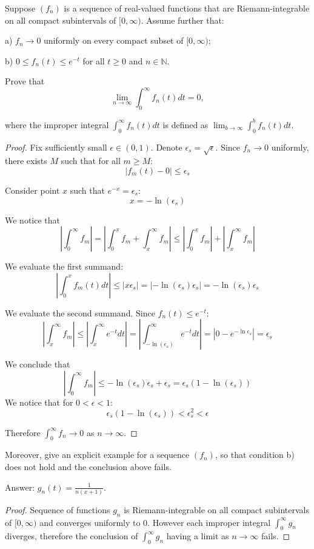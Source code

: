 \documentclass{article}
\begin{document}
\begin{tcolorbox}
Suppose $(f_n)$ is a sequence of real-valued functions that are Riemann-integrable on all compact subintervals of $[0,\infty)$. Assume further that:

a) $f_n \to 0$ uniformly on every compact subset of $[0,\infty)$;

b) $0 \leq f_n(t) \leq e^{-t}$ for all $t \geq 0$ and $n \in \mathbb{N}$.

Prove that
$$ \lim_{n \to \infty} \int_0^\infty f_n(t) dt = 0,$$

where the improper integral $\int_0^\infty f_n(t) dt$ is defined as  $\lim_{b\to\infty} \int_0^b f_n(t) dt$.
\end{tcolorbox}
\begin{proof}
Fix sufficiently small $\epsilon \in (0,1)$. Denote $\epsilon_s = \sqrt{\epsilon}$. Since $f_n \to 0$ uniformly, there exists $M$ such that for all $m \geq M$:
$$ | f_m(t) - 0 | \leq \epsilon_s $$

Consider point $x$ such that $e^{-x} = \epsilon_s$:
$$ x = - \ln(\epsilon_s) $$

We notice that
$$ \left| \int_0^\infty f_m \right| 
= \left| \int_0^x f_m + \int_x^\infty f_m \right|
\leq \left| \int_0^x f_m \right| + \left| \int_x^\infty f_m \right| $$

We evaluate the first summand:
$$ \left| \int_0^x f_m(t) dt \right| \leq | x \epsilon_s | 
= | - \ln(\epsilon_s) \epsilon_s | 
=  - \ln(\epsilon_s) \epsilon_s $$

We evaluate the second summand. Since $f_n(t) \leq e^{-t}$:
$$ \left| \int_x^\infty f_m \right| 
\leq \left | \int_x^\infty e^{-t} dt \right|
= \left| \int_{- \ln(\epsilon_s)}^\infty e^{-t} dt \right|
= \left| 0 - e^{ - \ln \epsilon_s} \right| = \epsilon_s $$

We conclude that 
$$ \left| \int_0^\infty f_m \right| 
\leq - \ln(\epsilon_s) \epsilon_s + \epsilon_s
= \epsilon_s (1-\ln(\epsilon_s)) $$
We notice that for $0 < \epsilon < 1$:
$$ \epsilon_s (1-\ln(\epsilon_s)) < \epsilon_s^2 < \epsilon $$

Therefore $\int_0^\infty f_n \to 0$ as $n \to \infty$.
\end{proof}

\begin{tcolorbox}
Moreover, give an explicit example for a sequence $(f_n)$, so that condition b) does not hold and the conclusion above fails.
\end{tcolorbox}
Answer: $g_n(t) = \frac{1}{n(x+1)}$.
\begin{proof}
Sequence of functions $g_n$ is Riemann-integrable on all compact subintervals of $[0,\infty)$ and converges uniformly to $0$.
However each improper integral $\int_0^\infty g_n$ diverges, therefore the conclusion of $\int_0^\infty g_n$ having a limit as $n \to \infty$ fails.
\end{proof}
\end{document}
